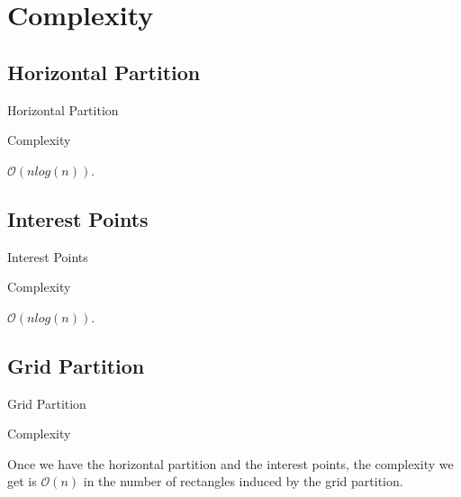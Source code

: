 \documentclass{beamer}
\begin{document}
\section{Complexity}

\subsection{Horizontal Partition}
\begin{frame}{Horizontal Partition}

\begin{block}{Complexity}

$\mathcal{O} \left( n log \left( n \right) \right)$.
	
\end{block}

\end{frame}

\subsection{Interest Points}
\begin{frame}{Interest Points}

\begin{block}{Complexity}

$\mathcal{O} \left( n log \left( n \right) \right)$.
	
\end{block}

\end{frame}

\subsection{Grid Partition}
\begin{frame}{Grid Partition}

\begin{block}{Complexity}

Once we have the horizontal partition and the interest points, the complexity we get is $\mathcal{O} \left( n \right)$ in the number of rectangles induced by the grid partition.
	
\end{block}

\end{frame}
\end{document}
